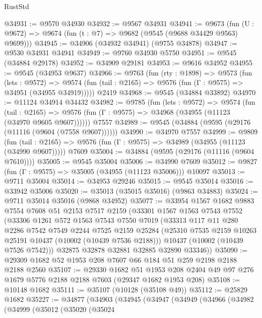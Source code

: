 \begin{lexlean}{RustStd}
\begin{coremodule}
@34931 := @9570 @34930
@34932 := @9567 @34931
@34941 := @9673
    (fun (U : @9672) => @9674 (fun (t : @7) => @9682 (@9545 (@9688 @34429 @9563) @9699)))
@34945 := @34906 (@34932 @34941) (@9755 @34878)
@34947 := @9530 @34931 @34941
@34949 := @9760 @34930 @5750
@34951 := @9545 (@34884 @29178)
@34952 := @34909 @29181
@34953 := @9616 @34952
@34955 := @9545 (@34953 @9637)
@34966 := @9763
    (fun (rty : @1898) =>
    @9573
      (fun (lets : @9572) =>
      @9574 (fun (tail : @2165) => @9576 (fun (Γ : @9575) => @34951 (@34955 @34919)))))
    @2419
@34968 := @9545 (@34884 @33892)
@34970 := @11124 @34914 @34432
@34982 := @9785
    (fun (lets : @9572) =>
    @9574
      (fun (tail : @2165) =>
      @9576 (fun (Γ : @9575) => @34968 (@34955 (@11123 (@34970 @9605 @9607))))))
    @7557
@34989 := @9545 (@34884 (@9595 (@29176 (@11116 (@9604 (@7558 @9607))))))
@34990 := @34970 @7557
@34999 := @9809
    (fun (tail : @2165) => @9576 (fun (Γ : @9575) => @34989 (@34955 (@11123 (@34990 @9607)))))
    @7609
@35004 := @34884 (@9595 (@29176 (@11116 (@9604 @7610))))
@35005 := @9545 @35004
@35006 := @34990 @7609
@35012 := @9827 (fun (Γ : @9575) => @35005 (@34955 (@11123 @35006))) @10097
@35013 := @9711 @35004
@35014 := @34953 @29246
@35015 := @9545 @35014
@35016 := @33942 @35006
@35020 := @35013 (@35015 @35016) (@9863 @34883)
@35024 := @9711 @35014 @35016 (@9868 @34952)
@35077 := @33954
    @1567
    @1682
    @9883
    @7554
    @7608
    @51
    @2153
    @7517
    @2159
    (@33301
      @1567
      @1563
      @7543
      @7552
      (@33306
        @1261
        @572
        @1563
        @7543
        @7550
        @7019
        (@33313
          @117
          @11
          @280
          @2286
          @7542
          @7549
          @2244
          @7525
          @2159
          @25284
          (@25310 @7535 @2159 @10263 @25191 @10437 (@10002 (@10439 @7536 @2188)))
          @10437
          (@10002 (@10439 @7526 @7542)))
        @32875
        @32878
        @32881
        @32885
        @32890
        @33346))
@35090 := @29309 @1682 @52 @1953 @208 @7607 @66 @184 @51 @259 @2198 @2188 @2188 @2560
@35107 := @29330
    @1682
    @51
    @1953
    @208
    @2404
    @49
    @97
    @276
    @1679
    @5776
    @2188
    @2188
    @7603
    (@29347 @1682 @1953 @208)
@35108 := @10148 @1682
@35111 := @35107 (@10128 (@35108 @49))
@35112 := @25829 @1682
@35227 := @34877
    (@34903
      (@34945
        (@34947
          (@34949
            (@34966
              (@34982
                (@34999
                  (@35012
                    (@35020
                      (@35024

\end{coremodule}
\end{lexlean}

